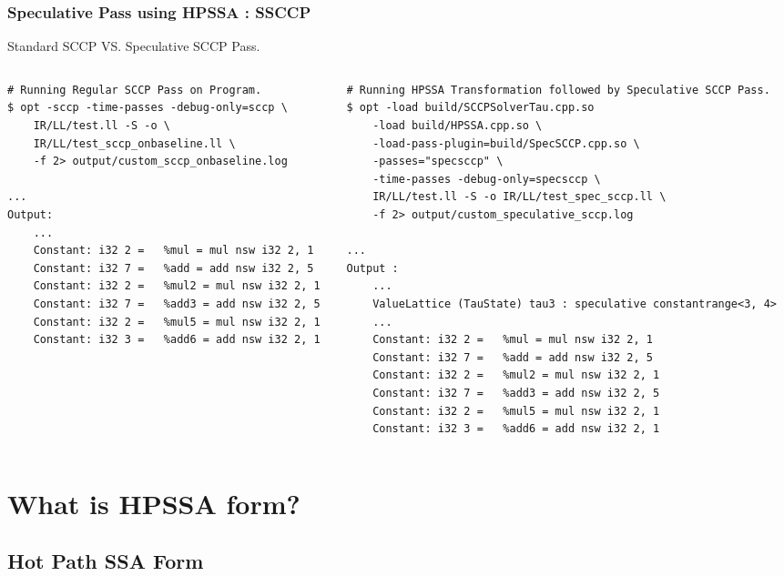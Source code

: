 \documentclass[aspectratio=169, compress]{beamer}
\begin{document}
\begin{frame}[fragile]
	\frametitle{Speculative Pass using HPSSA : SSCCP}
	Standard SCCP VS. Speculative SCCP Pass.
\begin{columns}
	\begin{column}{0.4\textwidth}
		\begin{verbatim}
# Running Regular SCCP Pass on Program.
$ opt -sccp -time-passes -debug-only=sccp \
	IR/LL/test.ll -S -o \
	IR/LL/test_sccp_onbaseline.ll \
	-f 2> output/custom_sccp_onbaseline.log

...
Output:
	...
	Constant: i32 2 =   %mul = mul nsw i32 2, 1
	Constant: i32 7 =   %add = add nsw i32 2, 5
	Constant: i32 2 =   %mul2 = mul nsw i32 2, 1
	Constant: i32 7 =   %add3 = add nsw i32 2, 5
	Constant: i32 2 =   %mul5 = mul nsw i32 2, 1
	Constant: i32 3 =   %add6 = add nsw i32 2, 1
		\end{verbatim}
	\end{column}
	\begin{column}{0.5\textwidth}  
		\begin{verbatim}
# Running HPSSA Transformation followed by Speculative SCCP Pass.
$ opt -load build/SCCPSolverTau.cpp.so 
	-load build/HPSSA.cpp.so \
	-load-pass-plugin=build/SpecSCCP.cpp.so \
	-passes="specsccp" \
	-time-passes -debug-only=specsccp \
	IR/LL/test.ll -S -o IR/LL/test_spec_sccp.ll \
	-f 2> output/custom_speculative_sccp.log
	
...
Output :
	...
	ValueLattice (TauState) tau3 : speculative constantrange<3, 4> 
	...
	Constant: i32 2 =   %mul = mul nsw i32 2, 1
	Constant: i32 7 =   %add = add nsw i32 2, 5
	Constant: i32 2 =   %mul2 = mul nsw i32 2, 1
	Constant: i32 7 =   %add3 = add nsw i32 2, 5
	Constant: i32 2 =   %mul5 = mul nsw i32 2, 1
	Constant: i32 3 =   %add6 = add nsw i32 2, 1
		\end{verbatim}
	\end{column}
\end{columns}
\end{frame}

\section{What is HPSSA form?}
\subsection{Hot Path SSA Form}
{
	
}
\end{document}
